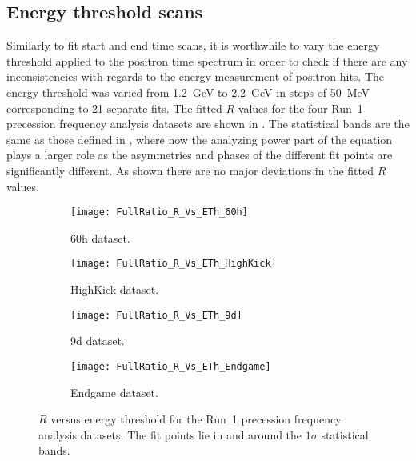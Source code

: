 \subsection{Energy threshold scans}


Similarly to fit start and end time scans, it is worthwhile to vary the energy threshold applied to the positron time spectrum in order to check if there are any inconsistencies with regards to the energy measurement of positron hits. The energy threshold was varied from \SI{1.2}{\GeV} to \SI{2.2}{\GeV} in steps of \SI{50}{\MeV} corresponding to 21 separate fits. The fitted $R$ values for the four Run~1 precession frequency analysis datasets are shown in . The statistical bands are the same as those defined in , where now the analyzing power part of the equation plays a larger role as the asymmetries and phases of the different fit points are significantly different. As shown there are no major deviations in the fitted $R$ values.


\begin{figure}[]
\centering
    \begin{subfigure}[]{0.45\textwidth}
        \centering
        \texttt{[image: FullRatio\_R\_Vs\_ETh\_60h]}
        \caption{60h dataset.}
    \end{subfigure}%
    \begin{subfigure}[]{0.45\textwidth}
        \centering
        \texttt{[image: FullRatio\_R\_Vs\_ETh\_HighKick]}
        \caption{HighKick dataset.}
    \end{subfigure}

    \begin{subfigure}[]{0.45\textwidth}
        \centering
        \texttt{[image: FullRatio\_R\_Vs\_ETh\_9d]}
        \caption{9d dataset.}
    \end{subfigure}%
    \begin{subfigure}[]{0.45\textwidth}
        \centering
        \texttt{[image: FullRatio\_R\_Vs\_ETh\_Endgame]}
        \caption{Endgame dataset.}
    \end{subfigure}
\caption[$R$ versus energy threshold]{$R$ versus energy threshold for the Run~1 precession frequency analysis datasets. The fit points lie in and around the $1\sigma$ statistical bands.}
\label{fig:energyThresholdScan_R}
\end{figure}



